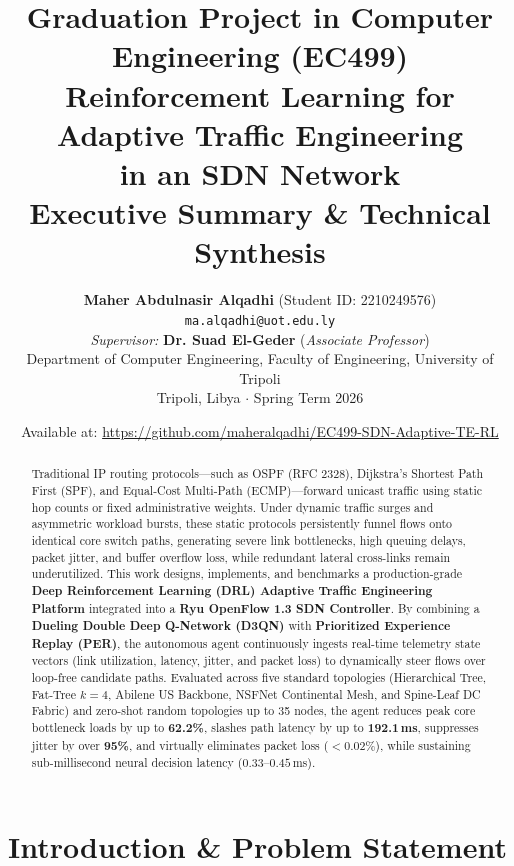\documentclass[10pt,twocolumn,a4paper]{article}
\title{
    \vspace{-0.8cm}
    {\large\color{secondary}\textbf{Graduation Project in Computer Engineering (EC499)}}\\[0.25cm]
    {\LARGE\color{primary}\textbf{Reinforcement Learning for Adaptive Traffic Engineering\\in an SDN Network}}\\[0.2cm]
    {\large\textbf{Executive Summary \& Technical Synthesis}}\vspace{-0.2cm}
}
\author{
    \textbf{Maher Abdulnasir Alqadhi} \quad (Student ID: 2210249576)\\
    \texttt{ma.alqadhi@uot.edu.ly}\\[0.15cm]
    \emph{Supervisor:} \textbf{Dr. Suad El-Geder} \quad (\emph{Associate Professor})\\[0.15cm]
    Department of Computer Engineering, Faculty of Engineering, University of Tripoli\\
    Tripoli, Libya $\cdot$ Spring Term 2026
}
\date{\vspace{-0.5cm}\small Available at: \url{https://github.com/maheralqadhi/EC499-SDN-Adaptive-TE-RL}}
\begin{document}
\maketitle

\begin{abstract}
\noindent
Traditional IP routing protocols---such as OSPF (RFC 2328), Dijkstra's Shortest Path First (SPF), and Equal-Cost Multi-Path (ECMP)---forward unicast traffic using static hop counts or fixed administrative weights. Under dynamic traffic surges and asymmetric workload bursts, these static protocols persistently funnel flows onto identical core switch paths, generating severe link bottlenecks, high queuing delays, packet jitter, and buffer overflow loss, while redundant lateral cross-links remain underutilized. This work designs, implements, and benchmarks a production-grade \textbf{Deep Reinforcement Learning (DRL) Adaptive Traffic Engineering Platform} integrated into a \textbf{Ryu OpenFlow 1.3 SDN Controller}. By combining a \textbf{Dueling Double Deep Q-Network (D3QN)} with \textbf{Prioritized Experience Replay (PER)}, the autonomous agent continuously ingests real-time telemetry state vectors (link utilization, latency, jitter, and packet loss) to dynamically steer flows over loop-free candidate paths. Evaluated across five standard topologies (Hierarchical Tree, Fat-Tree $k=4$, Abilene US Backbone, NSFNet Continental Mesh, and Spine-Leaf DC Fabric) and zero-shot random topologies up to 35 nodes, the agent reduces peak core bottleneck loads by up to \textbf{62.2\%}, slashes path latency by up to \textbf{192.1\,ms}, suppresses jitter by over \textbf{95\%}, and virtually eliminates packet loss ($<0.02\%$), while sustaining sub-millisecond neural decision latency ($0.33$--$0.45$\,ms).
\end{abstract}

\section{Introduction \& Problem Statement}
\end{document}
